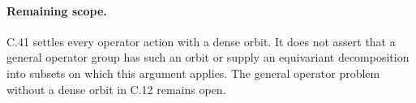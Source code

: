 \paragraph{Remaining scope.}
C.41 settles every operator action with a
dense orbit. It does not assert that a
general operator group has such an orbit
or supply an equivariant decomposition into
subsets on which this argument applies.
The general operator problem without a dense orbit
in C.12 remains open.
